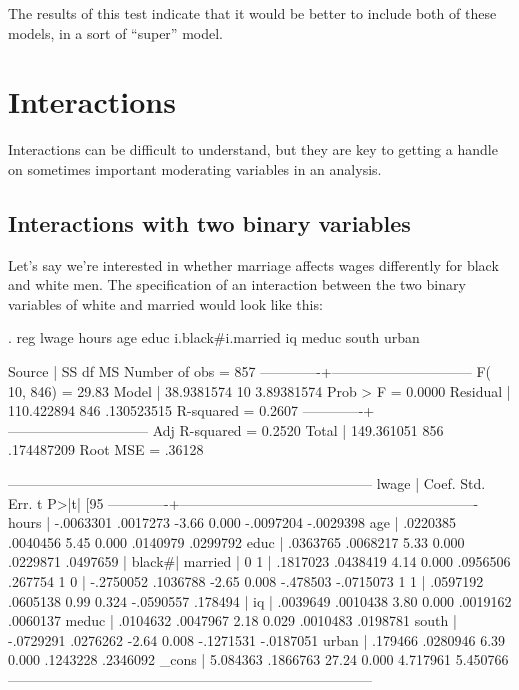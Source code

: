 \documentclass[12pt]{article}
\begin{document}
The results of this test indicate that it would be better to include
both of these models, in a sort of ``super'' model. 

\section{Interactions}
\label{sec:intreactions}

Interactions can be difficult to understand, but they are key to
getting a handle on sometimes important moderating variables in an
analysis. 

\subsection{Interactions with two binary variables}
\label{sec:inter-with-two}

Let's say we're interested in whether marriage affects wages
differently for black and white men. The specification of an
interaction between the two binary variables of white and married
would look like this:

\begin{stlog}
  
. reg lwage hours age educ i.black#i.married iq meduc south urban

      Source |       SS       df       MS              Number of obs =     857
-------------+------------------------------           F( 10,   846) =   29.83
       Model |  38.9381574    10  3.89381574           Prob > F      =  0.0000
    Residual |  110.422894   846  .130523515           R-squared     =  0.2607
-------------+------------------------------           Adj R-squared =  0.2520
       Total |  149.361051   856  .174487209           Root MSE      =  .36128

------------------------------------------------------------------------------
       lwage |      Coef.   Std. Err.      t    P>|t|     [95%
-------------+----------------------------------------------------------------
       hours |  -.0063301   .0017273    -3.66   0.000    -.0097204   -.0029398
         age |   .0220385   .0040456     5.45   0.000     .0140979    .0299792
        educ |   .0363765   .0068217     5.33   0.000     .0229871    .0497659
             |
       black#|
     married |
        0 1  |   .1817023   .0438419     4.14   0.000     .0956506     .267754
        1 0  |  -.2750052   .1036788    -2.65   0.008     -.478503   -.0715073
        1 1  |   .0597192   .0605138     0.99   0.324    -.0590557     .178494
             |
          iq |   .0039649   .0010438     3.80   0.000     .0019162    .0060137
       meduc |   .0104632   .0047967     2.18   0.029     .0010483    .0198781
       south |  -.0729291   .0276262    -2.64   0.008    -.1271531   -.0187051
       urban |    .179466   .0280946     6.39   0.000     .1243228    .2346092
       _cons |   5.084363   .1866763    27.24   0.000     4.717961    5.450766
------------------------------------------------------------------------------

\end{stlog}
\end{document}
